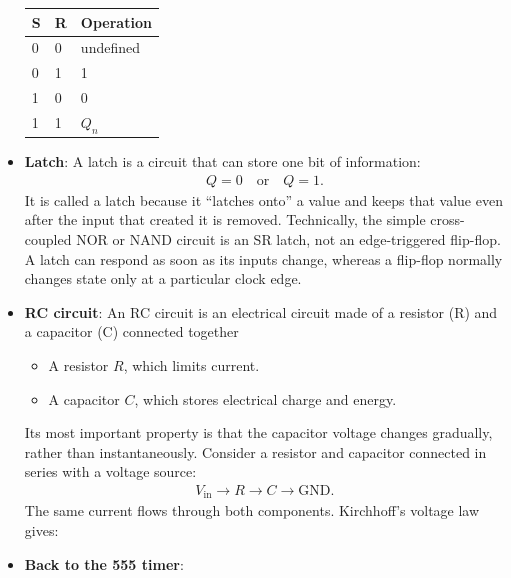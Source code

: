 \documentclass{report}
\begin{document}
\begin{itemize}
\begin{center}
\begin{tabularx}{\textwidth}{@{}XXX@{}}
                    \toprule
                    \textbf{S} & \textbf{R}  & \textbf{Operation} \\
                    \midrule
                    0 & 0 & undefined\\[2ex]
                    0 & 1 & 1\\[2ex]
                    1 & 0 & 0 \\[2ex]
                    1 & 1 & $Q_{n} $ \\
                    \bottomrule
                \end{tabularx}
            \end{center}
        \item \textbf{Latch}: A latch is a circuit that can store one bit of information:
            \begin{align*}
                Q = 0 \quad \text{or} \quad Q = 1
            .\end{align*}
            It is called a latch because it “latches onto” a value and keeps that value even after the input that created it is removed.
            \bigbreak \noindent 
            Technically, the simple cross-coupled NOR or NAND circuit is an SR latch, not an edge-triggered flip-flop. A latch can respond as soon as its inputs change, whereas a flip-flop normally changes state only at a particular clock edge.
        \item \textbf{RC circuit}: An RC circuit is an electrical circuit made of a resistor (R) and a capacitor (C) connected together
            \begin{itemize}
                \item A resistor \(R\), which limits current.
                \item A capacitor \(C\), which stores electrical charge and energy.
            \end{itemize}
            Its most important property is that the capacitor voltage changes gradually, rather than instantaneously. 
            \bigbreak \noindent 
            Consider a resistor and capacitor connected in series with a voltage source:
            \begin{align*}
                V_{\text{in}} \to R \to C \to \text{GND}
            .\end{align*}
            The same current flows through both components. Kirchhoff’s voltage law gives:
        \item \textbf{Back to the 555 timer}:  





    \end{itemize}
    
\end{document}
